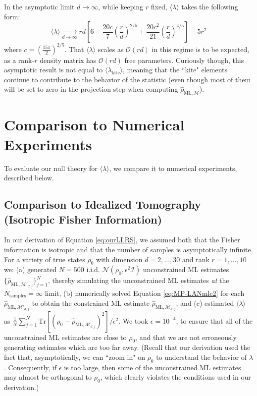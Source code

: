 \documentclass[aps,pra, twocolumn]{revtex4-1}
\newcommand{\M}{\mathcal{M}}
\newcommand{\rhohat}{\hat{\rho}}
\newcommand{\rhoML}[1]{\rhohat_{\scriptscriptstyle{\mathrm{ML},#1}}}
\begin{document}
In the asymptotic limit $d\rightarrow \infty$, while keeping $r$ fixed, $\langle \lambda \rangle$ takes the following form:
\begin{equation}
\langle \lambda \rangle \xrightarrow[d \rightarrow \infty]{} rd\left[6- \frac{20c}{7}\left(\frac{r}{d}\right)^{2/5} +\frac{20c^{2}}{21}\left(\frac{r}{d}\right)^{4/5}\right] - 5r^{2}
\end{equation}
where $c = \left(\frac{15\pi}{2}\right)^{2/5}$.
That $\langle \lambda \rangle$ scales as $\mathcal{O}(rd)$ in this regime is to be expected, as a rank-$r$ density matrix has $\mathcal{O}(rd)$ free parameters. Curiously though, this asymptotic result is not equal to $\langle \lambda_{\mathrm{kite}}\rangle$, meaning that the ``kite" elements continue to contribute to the behavior of the statistic (even though most of them will be set to zero in the projection step when computing $\rhoML{\M}$).

\section{Comparison to Numerical Experiments}

To evaluate our null theory for $\langle \lambda \rangle$, we compare it to numerical experiments, described below.

\subsection{Comparison to Idealized Tomography (Isotropic Fisher Information)}
\label{sec:theorycomp1}

In our derivation of Equation \eqref{eq:ourLLRS}, we assumed both that the Fisher information is isotropic and that the number of samples is asymptotically infinite. For a variety of true states $\rho_{0}$ with dimension  $d=2,\ldots,30$ and rank $r=1,\ldots,10$ we: (a) generated $N=500$ i.i.d. $\mathcal{N}(\rho_{0}, \epsilon^{2}\mathcal{I})$ unconstrained ML estimates $\{\rhoML{\M'_{d, j}}\}_{j=1}^{N}$, thereby simulating the unconstrained ML estimates \emph{at} the $N_{\mathrm{samples}} = \infty$ limit, (b) numerically solved Equation \eqref{eq:MP-LANmle2} for each $\rhoML{\M'_{d, j}}$ to obtain the constrained ML estimate $\rhoML{\M_{d, j}}$, and (c) estimated $\langle \lambda \rangle$ as $\frac{1}{N}\sum_{j=1}^{N}\mathrm{Tr}[(\rho_{0} - \rhoML{\M_{d,j}})^{2}]/\epsilon^{2}$. We took $\epsilon = 10^{-4}$, to ensure that all of the unconstrained ML estimates are close to $\rho_{0}$, and that we are not erroneously generating estimates which are too far away. (Recall that our derivation used the fact that, asymptotically, we can ``zoom in" on $\rho_{0}$ to understand the behavior of $\lambda$. Consequently, if $\epsilon$ is too large, then some of the unconstrained ML estimates may almost be orthogonal to $\rho_{0}$, which clearly violates the conditions used in our derivation.)
\end{document}
